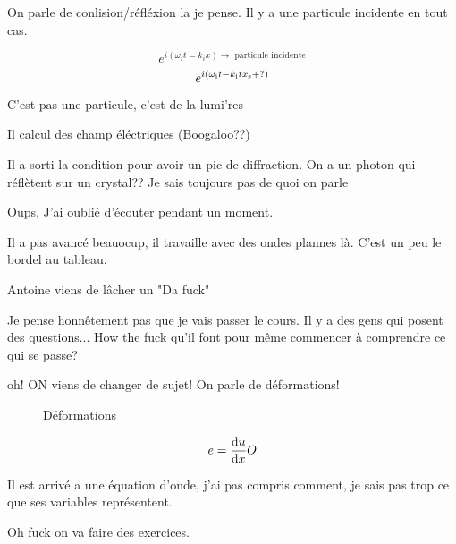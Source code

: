 On parle de conlision/réfléxion la je pense. Il y a une particule incidente en tout cas.

$$e^{i(\omega_it=k_ix) \to \text{ particule incidente}}$$
$$e^{i(\omega_{\rm i}t-k_{\rm i}tx_{\rm s}+ ?)}$$

C'est pas une particule, c'est de la lumi'res

Il calcul des champ éléctriques (Boogaloo??)

Il a sorti la condition pour avoir un pic de diffraction. On a un photon qui réflètent sur un crystal?? Je sais toujours pas de quoi on parle

Oups, J'ai oublié d'écouter pendant un moment.

Il a pas avancé beauocup, il travaille avec des ondes plannes là. C'est un peu le bordel au tableau.

Antoine viens de lâcher un "Da fuck"

Je pense honnêtement pas que je vais passer le cours. Il y a des gens qui posent des questions... How the fuck qu'il font pour même commencer à comprendre ce qui se passe?

oh! ON viens de changer de sujet! On parle de déformations!

\begin{figure}[ht]
    \centering
    \caption{Déformations}
    \label{fig:déformations}
\end{figure}

$$e = \dv{u}{x}O$$ 

Il est arrivé a une équation d'onde, j'ai pas compris comment, je sais pas trop ce que ses variables représentent. 

Oh fuck on va faire des exercices.






